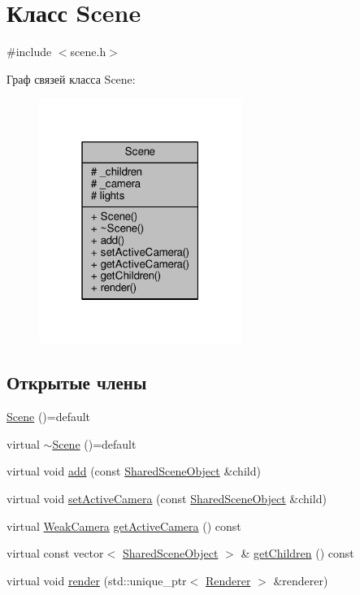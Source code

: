 \hypertarget{class_scene}{}\section{Класс Scene}
\label{class_scene}


{\ttfamily \#include $<$scene.\+h$>$}



Граф связей класса Scene\+:
\nopagebreak
\begin{figure}[H]
\begin{center}
\leavevmode
\includegraphics[width=187pt]{d4/d7f/class_scene__coll__graph}
\end{center}
\end{figure}
\subsection*{Открытые члены}
\begin{DoxyCompactItemize}
\item 
\hyperlink{class_scene_a93ccc41b0a2f6c24e467d5d9de76ec0d}{Scene} ()=default
\item 
virtual \hyperlink{class_scene_af6e09d91ebd10ae9cc7c12c39d06386c}{$\sim$\+Scene} ()=default
\item 
virtual void \hyperlink{class_scene_ada0a975a207aa2670498fee329c6c480}{add} (const \hyperlink{sceneobject_8h_af9afe0f4fe2038e305b8b22ff495305f}{Shared\+Scene\+Object} \&child)
\item 
virtual void \hyperlink{class_scene_aac8b52a8123b9d4c1dceb417b9360085}{set\+Active\+Camera} (const \hyperlink{sceneobject_8h_af9afe0f4fe2038e305b8b22ff495305f}{Shared\+Scene\+Object} \&child)
\item 
virtual \hyperlink{camera_8h_a7b9616f276c6529ece2bbfb711f5c756}{Weak\+Camera} \hyperlink{class_scene_acfa5379bbdff26d3a01fa11dc3791295}{get\+Active\+Camera} () const 
\item 
virtual const vector$<$ \hyperlink{sceneobject_8h_af9afe0f4fe2038e305b8b22ff495305f}{Shared\+Scene\+Object} $>$ \& \hyperlink{class_scene_a2fcdd4356401f0bedb6d8b523bc1eaba}{get\+Children} () const 
\item 
virtual void \hyperlink{class_scene_a7f0c78f0935e2f080c6252cc4782ddbf}{render} (std\+::unique\+\_\+ptr$<$ \hyperlink{class_renderer}{Renderer} $>$ \&renderer)
\end{DoxyCompactItemize}
